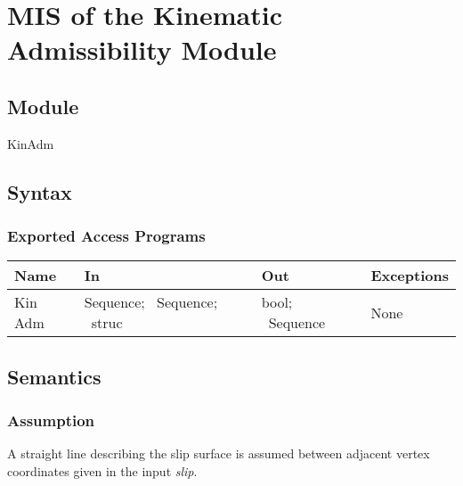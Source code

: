 \documentclass[12pt, titlepage]{article}
\begin{document}

\section{MIS of the Kinematic Admissibility
  Module} \label{sec:KinAdmMod}

\subsection{Module}
KinAdm

\subsection{Syntax}

\subsubsection{Exported Access Programs}
\begin{center}
\renewcommand*{\arraystretch}{1.5}
\begin{tabular}{| p{} | p{} | 
p{} | p{} |} \hline 

  \textbf{Name} & \textbf{In} & \textbf{Out} & \textbf{Exceptions}
  \\ \hline

  Kin Adm & Sequence; ~\newline Sequence; ~\newline struc & bool;
  ~\newline Sequence & None \\ \hline

\end{tabular}
\end{center}

\subsection{Semantics}

\subsubsection{Assumption}
A straight line describing the slip surface is assumed between
adjacent vertex coordinates given in the input \textit{slip}.
\end{document}
